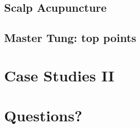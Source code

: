 \documentclass{beamer}
\begin{document}
\subsection{Scalp Acupuncture}

\subsection{Master Tung: top points}

\section{Case Studies II}

\section{Questions?} 

\begin{frame}
\end{frame}
\end{document}
